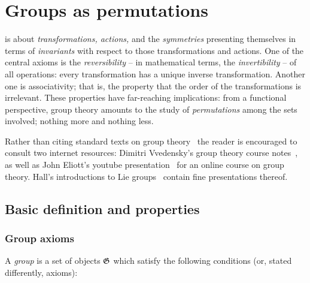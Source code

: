 \chapter{Groups as permutations}
\label{2012-m-ch-gt}

 is about {\em transformations, actions,} and the {\em symmetries} presenting themselves in terms of {\em invariants} with respect to those transformations and actions.
One of the central axioms is the {\em reversibility} -- in mathematical terms, the {\em invertibility} -- of all operations: every transformation has a unique inverse transformation.
Another one is associativity; that is, the property that the order of the transformations is irrelevant.
These properties have far-reaching implications: from a functional perspective, group theory amounts to the study of {\em permutations} among the sets involved; nothing more and nothing less.

Rather than citing standard texts on group theory~\cite{rotman} the reader is encouraged to consult
two internet resources: Dimitri Vvedensky's group theory course notes~\cite{vvedensky-grouptheory},
as well as
John Eliott's youtube presentation~\cite{eliott-gt-yt} for an online course on group theory.
Hall's introductions to Lie groups~\cite{hall-2000,hall-2015} contain fine presentations thereof.


\section{Basic definition and properties}

\subsection{Group axioms}

A {\em group} is a set of objects ${\frak G}$ which satisfy the following conditions (or, stated differently, axioms):

